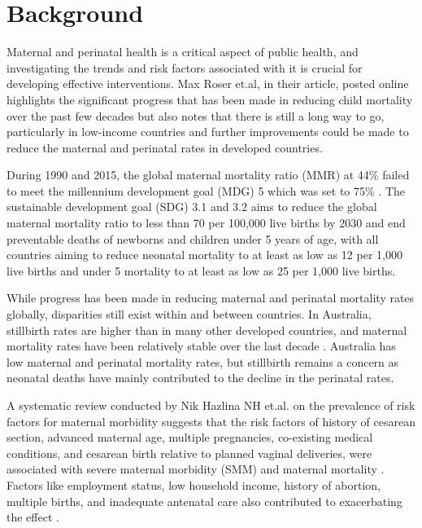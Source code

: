 \section{Background}

Maternal and perinatal health is a critical aspect of public health, and investigating the trends and risk factors associated with it is crucial for developing effective interventions. Max Roser et.al, in their article, posted online highlights the significant progress that has been made in reducing child mortality over the past few decades but also notes that there is still a long way to go, particularly in low-income countries and further improvements could be made to reduce the maternal and perinatal rates in developed countries.

During 1990 and 2015, the global maternal mortality ratio (MMR) at 44\% failed to meet the millennium development goal (MDG) 5 which was set to 75\% \cite{bongaarts_2016}.  The sustainable development goal (SDG) 3.1 and 3.2 aims to reduce the global maternal mortality ratio to less than 70 per 100,000 live births by 2030 and end preventable deaths of newborns and children under 5 years of age, with all countries aiming to reduce neonatal mortality to at least as low as 12 per 1,000 live births and under 5 mortality to at least as low as 25 per 1,000 live births. 

While progress has been made in reducing maternal and perinatal mortality rates globally, disparities still exist within and between countries. In Australia, stillbirth rates are higher than in many other developed countries, and maternal mortality rates have been relatively stable over the last decade \cite{owidchildmortality}. Australia has low maternal and perinatal mortality rates, but stillbirth remains a concern as neonatal deaths have mainly contributed to the decline in the perinatal rates. 

A systematic review conducted by Nik Hazlina NH et.al. on the prevalence of risk factors for maternal morbidity suggests that the risk factors of history of cesarean section, advanced maternal age, multiple pregnancies, co-existing medical conditions, and cesarean birth relative to planned vaginal deliveries, were associated with severe maternal morbidity (SMM) and maternal mortality \cite{nikkamil_2022,sauve_kramer_2007}. Factors like employment status, low household income, history of abortion, multiple births, and inadequate antenatal care also contributed to exacerbating the effect \cite{nikkamil_2022}.

